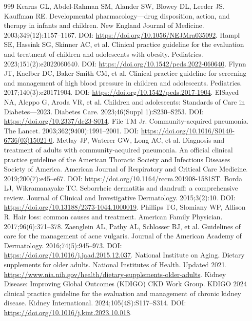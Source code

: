 \documentclass[11pt,oneside]{book}
\begin{document}
\begin{thebibliography}{999}
Kearns GL, Abdel-Rahman SM, Alander SW, Blowey DL, Leeder JS, Kauffman RE. Developmental pharmacology---drug disposition, action, and therapy in infants and children. New England Journal of Medicine. 2003;349(12):1157--1167. DOI: \url{https://doi.org/10.1056/NEJMra035092}.
Hampl SE, Hassink SG, Skinner AC, et al. Clinical practice guideline for the evaluation and treatment of children and adolescents with obesity. Pediatrics. 2023;151(2):e2022060640. DOI: \url{https://doi.org/10.1542/peds.2022-060640}.
Flynn JT, Kaelber DC, Baker-Smith CM, et al. Clinical practice guideline for screening and management of high blood pressure in children and adolescents. Pediatrics. 2017;140(3):e20171904. DOI: \url{https://doi.org/10.1542/peds.2017-1904}.
ElSayed NA, Aleppo G, Aroda VR, et al. Children and adolescents: Standards of Care in Diabetes---2023. Diabetes Care. 2023;46(Suppl 1):S230--S253. DOI: \url{https://doi.org/10.2337/dc23-S014}.
File TM Jr. Community-acquired pneumonia. The Lancet. 2003;362(9400):1991--2001. DOI: \url{https://doi.org/10.1016/S0140-6736(03)15021-0}.
Metlay JP, Waterer GW, Long AC, et al. Diagnosis and treatment of adults with community-acquired pneumonia. An official clinical practice guideline of the American Thoracic Society and Infectious Diseases Society of America. American Journal of Respiratory and Critical Care Medicine. 2019;200(7):e45--e67. DOI: \url{https://doi.org/10.1164/rccm.201908-1581ST}.
Borda LJ, Wikramanayake TC. Seborrheic dermatitis and dandruff: a comprehensive review. Journal of Clinical and Investigative Dermatology. 2015;3(2):10. DOI: \url{https://doi.org/10.13188/2373-1044.1000019}.
Phillips TG, Slomiany WP, Allison R. Hair loss: common causes and treatment. American Family Physician. 2017;96(6):371--378.
Zaenglein AL, Pathy AL, Schlosser BJ, et al. Guidelines of care for the management of acne vulgaris. Journal of the American Academy of Dermatology. 2016;74(5):945--973. DOI: \url{https://doi.org/10.1016/j.jaad.2015.12.037}.
National Institute on Aging. Dietary supplements for older adults. National Institutes of Health. Updated 2021. \url{https://www.nia.nih.gov/health/dietary-supplements-older-adults}.
Kidney Disease: Improving Global Outcomes (KDIGO) CKD Work Group. KDIGO 2024 clinical practice guideline for the evaluation and management of chronic kidney disease. Kidney International. 2024;105(4S):S117--S314. DOI: \url{https://doi.org/10.1016/j.kint.2023.10.018}.

\end{thebibliography}
\end{document}
